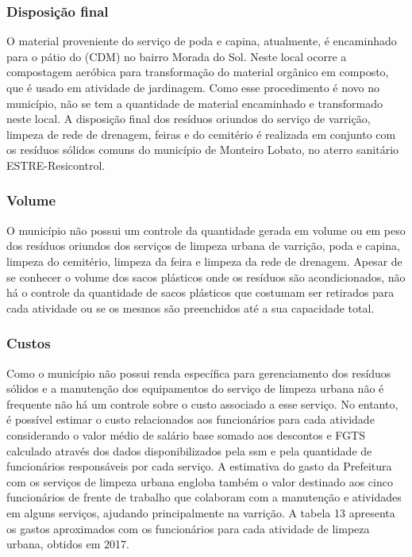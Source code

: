 	\subsubsection{Disposição final}
	O material proveniente do serviço de poda e capina, atualmente, é encaminhado para o pátio do (CDM) no bairro Morada do Sol. Neste local ocorre a compostagem aeróbica para transformação do material orgânico em composto, que é usado em atividade de jardinagem. Como esse procedimento é novo no município, não se tem a quantidade de material encaminhado e transformado neste local. 
	A disposição final dos resíduos oriundos do serviço de varrição, limpeza de rede de drenagem, feiras e do cemitério é realizada em conjunto com os resíduos sólidos comuns do município de Monteiro Lobato, no aterro sanitário ESTRE-Resicontrol.
	
	\subsubsection{Volume}
	
	O município não possui um controle da quantidade gerada em volume ou em peso dos resíduos oriundos dos serviços de limpeza urbana de varrição, poda e capina, limpeza do cemitério, limpeza da feira e limpeza da rede de drenagem.
	Apesar de se conhecer o volume dos sacos plásticos onde os resíduos são acondicionados, não há o controle da quantidade de sacos plásticos que costumam ser retirados para cada atividade ou se os mesmos são preenchidos até a sua capacidade total.
	
	\subsubsection{Custos}
	
	Como o município não possui renda específica para gerenciamento dos resíduos sólidos e a manutenção dos equipamentos do serviço de limpeza urbana não é frequente não há um controle sobre o custo associado a esse serviço. No entanto, é possível estimar o custo relacionados aos funcionários para cada atividade considerando o valor médio de salário base somado aos descontos e FGTS calculado através dos dados disponibilizados pela \gls{ssm} e pela quantidade de funcionários responsáveis por cada serviço. A estimativa do gasto da Prefeitura com os serviços de limpeza urbana engloba também o valor destinado aos cinco funcionários de frente de trabalho que colaboram com a manutenção e atividades em alguns serviços, ajudando principalmente na varrição.  A tabela 13 apresenta os gastos aproximados com os funcionários para cada atividade de limpeza urbana, obtidos em 2017.
	
